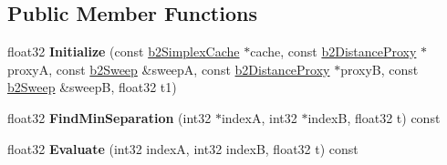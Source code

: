 \subsection*{Public Member Functions}
\begin{DoxyCompactItemize}
\item 
\mbox{\label{structb2SeparationFunction_acfe0bb0d85a5001f1e957eea2137e039}} 
float32 {\bfseries Initialize} (const \hyperlink{structb2SimplexCache}{b2\+Simplex\+Cache} $\ast$cache, const \hyperlink{structb2DistanceProxy}{b2\+Distance\+Proxy} $\ast$proxyA, const \hyperlink{structb2Sweep}{b2\+Sweep} \&sweepA, const \hyperlink{structb2DistanceProxy}{b2\+Distance\+Proxy} $\ast$proxyB, const \hyperlink{structb2Sweep}{b2\+Sweep} \&sweepB, float32 t1)
\item 
\mbox{\label{structb2SeparationFunction_ac0a603a96343be37d0a0bdf852be1e77}} 
float32 {\bfseries Find\+Min\+Separation} (int32 $\ast$indexA, int32 $\ast$indexB, float32 t) const
\item 
\mbox{\label{structb2SeparationFunction_a68224ac8a89b10a9d1b39789ccc78d4c}} 
float32 {\bfseries Evaluate} (int32 indexA, int32 indexB, float32 t) const
\end{DoxyCompactItemize}
